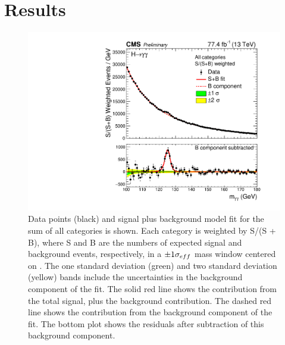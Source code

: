 \chapter{Results}
\label{chap:results}


\begin{figure}[hptb]
\centering
\includegraphics[width=\textwidth]{Figures/Results/MassPlot.pdf}
\caption{
  Data points (black) and signal plus background model fit for the sum of all categories is shown. 
  Each category is weighted by S/(S + B), 
  where S and B are the numbers of expected signal and background events, respectively, 
  in a $\pm 1 \sigma_{eff}$ mass window centered on \mH. 
  The one standard deviation (green) and two standard deviation (yellow) bands 
  include the uncertainties in the background component of the fit. 
  The solid red line shows the contribution from the total signal, plus the background contribution. 
  The dashed red line shows the contribution from the background component of the fit. 
  The bottom plot shows the residuals after subtraction of this background component.
}
\label{fig:results_MassPlot}
\end{figure}

